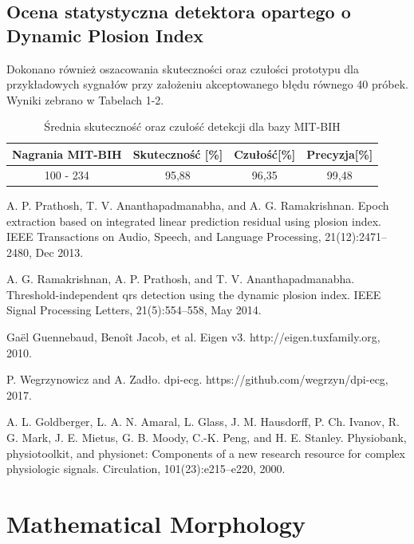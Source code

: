 \documentclass[10pt,a4paper]{article}
\begin{document}
\subsection{Ocena statystyczna detektora opartego o Dynamic Plosion Index}
Dokonano również oszacowania skuteczności oraz czułości prototypu dla przykładowych sygnałów przy założeniu akceptowanego błędu równego 40 próbek. Wyniki zebrano w Tabelach 1-2.
\FloatBarrier
\begin{table}[h]
\centering
\caption{Średnia skuteczność oraz czułość detekcji dla bazy MIT-BIH}
\label{table_1}
\begin{tabular}{|c|c|c|c|}
	\hline
	Nagrania MIT-BIH & Skuteczność [\%] & Czułość[\%] & Precyzja[\%] \\
	\hline
	100 - 234 & 95,88 & 96,35 &  99,48  \\ 
	\hline
\end{tabular}
\end{table}

%
%
\newpage
\begin{thebibliography}{5}
A. P. Prathosh, T. V. Ananthapadmanabha, and A. G. Ramakrishnan. Epoch extraction based on
integrated linear prediction residual using plosion index. IEEE Transactions on Audio, Speech, and
Language Processing, 21(12):2471–2480, Dec 2013.

A. G. Ramakrishnan, A. P. Prathosh, and T. V. Ananthapadmanabha. Threshold-independent qrs
detection using the dynamic plosion index. IEEE Signal Processing Letters, 21(5):554–558, May 2014.
 
Gaël Guennebaud, Benoît Jacob, et al. Eigen v3. http://eigen.tuxfamily.org, 2010.

P. Wegrzynowicz and A. Zadło. dpi-ecg. https://github.com/wegrzyn/dpi-ecg, 2017.

A. L. Goldberger, L. A. N. Amaral, L. Glass, J. M. Hausdorff, P. Ch. Ivanov, R. G. Mark, J. E. Mietus,
G. B. Moody, C.-K. Peng, and H. E. Stanley. Physiobank, physiotoolkit, and physionet: Components
of a new research resource for complex physiologic signals. Circulation, 101(23):e215–e220, 2000.

\end{thebibliography}


\newpage
\section{Mathematical Morphology}
\end{document}
